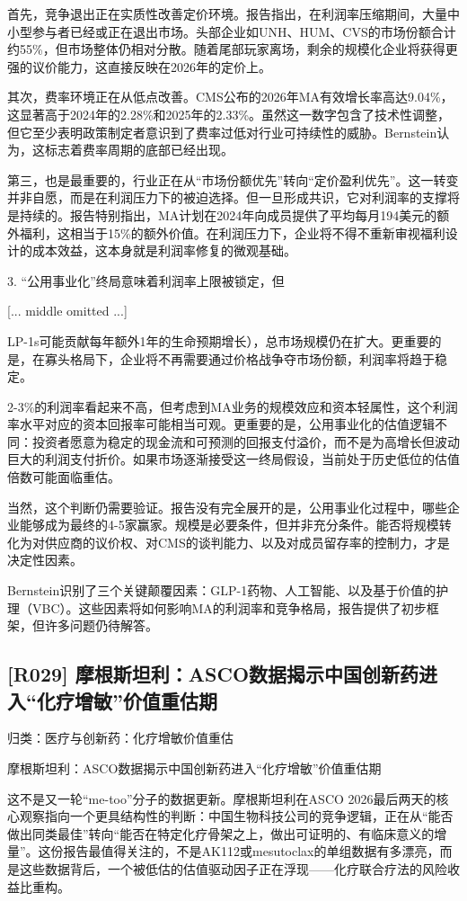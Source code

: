 \documentclass[11pt]{ctexart}
\begin{document}
首先，竞争退出正在实质性改善定价环境。报告指出，在利润率压缩期间，大量中小型参与者已经或正在退出市场。头部企业如UNH、HUM、CVS的市场份额合计约55\%，但市场整体仍相对分散。随着尾部玩家离场，剩余的规模化企业将获得更强的议价能力，这直接反映在2026年的定价上。

其次，费率环境正在从低点改善。CMS公布的2026年MA有效增长率高达9.04\%，这显著高于2024年的2.28\%和2025年的2.33\%。虽然这一数字包含了技术性调整，但它至少表明政策制定者意识到了费率过低对行业可持续性的威胁。Bernstein认为，这标志着费率周期的底部已经出现。

第三，也是最重要的，行业正在从“市场份额优先”转向“定价盈利优先”。这一转变并非自愿，而是在利润压力下的被迫选择。但一旦形成共识，它对利润率的支撑将是持续的。报告特别指出，MA计划在2024年向成员提供了平均每月194美元的额外福利，这相当于15\%的额外价值。在利润压力下，企业将不得不重新审视福利设计的成本效益，这本身就是利润率修复的微观基础。

3. “公用事业化”终局意味着利润率上限被锁定，但

[... middle omitted ...]

LP-1s可能贡献每年额外1年的生命预期增长），总市场规模仍在扩大。更重要的是，在寡头格局下，企业将不再需要通过价格战争夺市场份额，利润率将趋于稳定。

2-3\%的利润率看起来不高，但考虑到MA业务的规模效应和资本轻属性，这个利润率水平对应的资本回报率可能相当可观。更重要的是，公用事业化的估值逻辑不同：投资者愿意为稳定的现金流和可预测的回报支付溢价，而不是为高增长但波动巨大的利润支付折价。如果市场逐渐接受这一终局假设，当前处于历史低位的估值倍数可能面临重估。

当然，这个判断仍需要验证。报告没有完全展开的是，公用事业化过程中，哪些企业能够成为最终的4-5家赢家。规模是必要条件，但并非充分条件。能否将规模转化为对供应商的议价权、对CMS的谈判能力、以及对成员留存率的控制力，才是决定性因素。

Bernstein识别了三个关键颠覆因素：GLP-1药物、人工智能、以及基于价值的护理（VBC）。这些因素将如何影响MA的利润率和竞争格局，报告提供了初步框架，但许多问题仍待解答。

\subsection{[R029] 摩根斯坦利：ASCO数据揭示中国创新药进入“化疗增敏”价值重估期}
{\small\color{refgray}归类：医疗与创新药：化疗增敏价值重估}

摩根斯坦利：ASCO数据揭示中国创新药进入“化疗增敏”价值重估期

这不是又一轮“me-too”分子的数据更新。摩根斯坦利在ASCO 2026最后两天的核心观察指向一个更具结构性的判断：中国生物科技公司的竞争逻辑，正在从“能否做出同类最佳”转向“能否在特定化疗骨架之上，做出可证明的、有临床意义的增量”。这份报告最值得关注的，不是AK112或mesutoclax的单组数据有多漂亮，而是这些数据背后，一个被低估的估值驱动因子正在浮现——化疗联合疗法的风险收益比重构。
\end{document}
